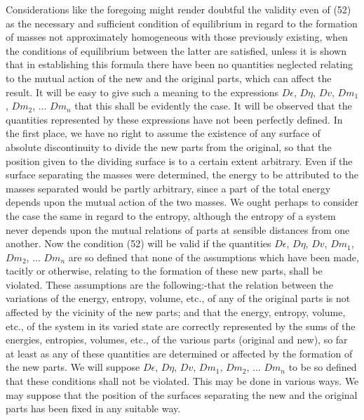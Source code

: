 \documentclass[12pt]{article}
\begin{document}
Considerations like the foregoing might render doubtful the validity even of (52) as the necessary and sufficient condition of equilibrium in regard to the formation of masses not approximately homogeneous with those previously existing, when the conditions of equilibrium between the latter are satisfied, unless it is shown that in establishing this formula there have been no quantities neglected relating to the mutual action of the new and the original parts, which can affect the result.  It will be easy to give such a meaning to the expressions $D\epsilon$, $D\eta$, $Dv$, $Dm_1$, $Dm_2$, ... $D m_n$ that this shall be evidently the case. It will be observed that the quantities represented by these expressions have not been perfectly defined. In the first place, we have no right to assume the existence of any surface of absolute discontinuity to divide the new parts from the original, so that the position given to the dividing surface is to a certain extent arbitrary. 
Even if the surface separating the masses were determined, the energy to be attributed to the masses separated would be partly arbitrary, since a part of the total energy depends upon the mutual action of the two masses. We ought perhaps to consider the case the same in regard to the entropy, although the entropy of a system never depends upon the mutual relations of parts at sensible distances from one another. Now the condition (52) will be valid if the quantities $D\epsilon$, $D\eta$, $Dv$, $Dm_1$, $Dm_2$, ... $D m_n$ are so defined that none of the assumptions which have been made, tacitly or otherwise, relating to the formation of these new parts, shall be violated. These assumptions are the following:-that the relation between the variations of the energy, entropy, volume, etc., of any of the original parts is not affected by the vicinity of the new parts; and that the energy, entropy, volume, etc., of the system in its varied state are correctly represented by the sums of the energies, entropies, volumes, etc., of the various parts (original and new), so far at least as any of these quantities are determined or affected by the formation of the new parts. We will suppose $D\epsilon$, $D\eta$, $Dv$, $Dm_1$, $Dm_2$, ... $D m_n$ to be so defined that these conditions shall not be violated.  This may be done in various ways. We may suppose that the position of the surfaces separating the new and the original parts has been fixed in any suitable way. 
\end{document}
